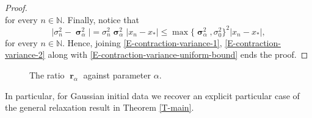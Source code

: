 \documentclass[reqno]{amsart}
\DeclareMathOperator{\bsigma}{\boldsymbol{\sigma}}
\DeclareMathOperator{\br}{\boldsymbol{r}}
\numberwithin{equation}{section}
\begin{document}
{\begin{proof}
\begin{equation}
\end{equation}
for every $n\in \mathbb{N}$. Finally, notice that
\begin{equation}\label{E-contraction-variance-2}
\vert \sigma_n^2-\bsigma_\alpha^2\vert=\sigma_n^2\bsigma_\alpha^2\left\vert x_n-x_*\right\vert\leq \max\{\bsigma_\alpha^2,\sigma_0^2\}^2\left\vert x_n-x_*\right\vert,
\end{equation}
for every $n\in \mathbb{N}$. Hence, joining \eqref{E-contraction-variance-1}, \eqref{E-contraction-variance-2} along with \eqref{E-contraction-variance-uniform-bound} ends the proof.
\end{proof}

\begin{figure}[t]
\centering
{}
\caption{The ratio $\br_\alpha$ against parameter $\alpha$.}
\label{fig:decay-variances}
\end{figure}

In particular, for Gaussian initial data we recover an explicit particular case of the general relaxation result in Theorem \ref{T-main}.


}
\end{document}
